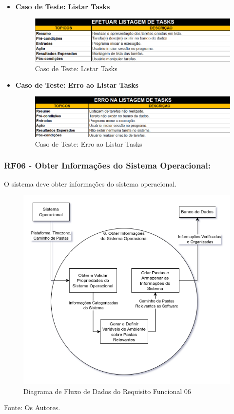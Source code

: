 \documentclass[a4paper,12pt]{article}
\begin{document}
\pagebreak
\begin{itemize}
	\item\textbf{Caso de Teste: Listar Tasks}
	\begin{figure}[H]
		\centering
		\includegraphics[scale=0.75]{UnitTest/trueCase/listTask.png}
		\caption{Caso de Teste: Listar Tasks}
	\end{figure}
	\item\textbf{Caso de Teste: Erro ao Listar Tasks}
	\begin{figure}[H]
		\centering
		\includegraphics[scale=0.75]{UnitTest/falseCase/listTask.png}
		\caption{Caso de Teste: Erro ao Listar Tasks}
	\end{figure}
\end{itemize}

\pagebreak
\subsubsection{RF06 - Obter Informações do Sistema Operacional:}
O sistema deve obter informações do sistema operacional.
\begin{figure}[H]
	\centering
	\includegraphics[scale=0.45]{DFDs/RF06.drawio.png}
	\caption{Diagrama de Fluxo de Dados do Requisito Funcional 06}
\end{figure}
\noindent Fonte: Os Autores.
\end{document}
